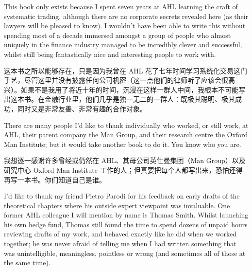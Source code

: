 
\begin{englishblock} This book only exists because I spent seven years at AHL learning the craft of systematic trading, although there are no corporate secrets revealed here (as their lawyers will be pleased to know). I wouldn't have been able to write this without spending most of a decade immersed amongst a group of people who almost uniquely in the finance industry managed to be incredibly clever and successful, whilst still being fantastically nice and interesting people to work with. \end{englishblock}

\begin{chineseblock}这本书之所以能够存在，只是因为我曾在 AHL 花了七年时间学习系统化交易这门手艺，尽管这里并没有披露任何公司机密（这一点他们的律师听了应该会很高兴）。如果不是我用了将近十年的时间，沉浸在这样一群人中间，我根本不可能写出这本书。在金融行业里，他们几乎是独一无二的一群人：既极其聪明、极其成功，同时又是非常友善、非常有趣的合作对象。\end{chineseblock}

\bipairgap

\begin{englishblock} There are many people I'd like to thank individually who worked, or still work, at AHL, their parent company the Man Group, and their research centre the Oxford Man Institute; but it would take another book to do it. You know who you are. \end{englishblock}

\begin{chineseblock}我想逐一感谢许多曾经或仍然在 AHL、其母公司英仕曼集团（Man Group）以及研究中心 Oxford Man Institute 工作的人；但真要把每个人都写出来，恐怕还得再写一本书。你们知道自己是谁。\end{chineseblock}

\bipairgap

\begin{englishblock} I'd like to thank my friend Pietro Parodi for his feedback on early drafts of the theoretical chapters where his outside expert viewpoint was invaluable. One former AHL colleague I will mention by name is Thomas Smith. Whilst launching his own hedge fund, Thomas still found the time to spend dozens of unpaid hours reviewing drafts of my work, and behaved exactly like he did when we worked together; he was never afraid of telling me when I had written something that was unintelligible, meaningless, pointless or wrong (and sometimes all of those at the same time). \end{englishblock}


